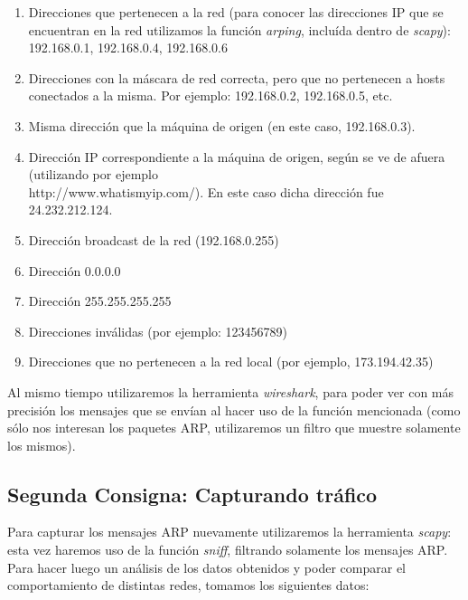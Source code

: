 \begin{enumerate}
 \item Direcciones que pertenecen a la red (para conocer las direcciones IP que se encuentran en la red utilizamos la funci\'on \emph{arping}, inclu\'ida dentro de \emph{scapy}): 192.168.0.1, 192.168.0.4, 192.168.0.6
 \item Direcciones con la m\'ascara de red correcta, pero que no pertenecen a hosts conectados a la misma. Por ejemplo: 192.168.0.2, 192.168.0.5, etc.
 \item Misma direcci\'on que la m\'aquina de origen (en este caso, 192.168.0.3).
 \item Direcci\'on IP correspondiente a la m\'aquina de origen, seg\'un se ve de afuera (utilizando por ejemplo \\ http://www.whatismyip.com/). En este caso dicha direcci\'on fue 24.232.212.124.
 \item Direcci\'on broadcast de la red (192.168.0.255)
 \item Direcci\'on 0.0.0.0
 \item Direcci\'on 255.255.255.255
 \item Direcciones inv\'alidas (por ejemplo: 123456789)
 \item Direcciones que no pertenecen a la red local (por ejemplo, 173.194.42.35)
\end{enumerate}

Al mismo tiempo utilizaremos la herramienta \emph{wireshark}, para poder ver con m\'as precisi\'on los mensajes que se env\'ian al hacer uso de la funci\'on mencionada (como s\'olo nos interesan los paquetes ARP, utilizaremos un filtro que muestre solamente los mismos).

\subsection{Segunda Consigna: Capturando tr\'afico}\label{sec:metodos_2}

Para capturar los mensajes ARP nuevamente utilizaremos la herramienta \emph{scapy}: esta vez haremos uso de la funci\'on \emph{sniff}, filtrando solamente los mensajes ARP. Para hacer luego un an\'alisis de los datos obtenidos y poder comparar el comportamiento de distintas redes, tomamos los siguientes datos:

